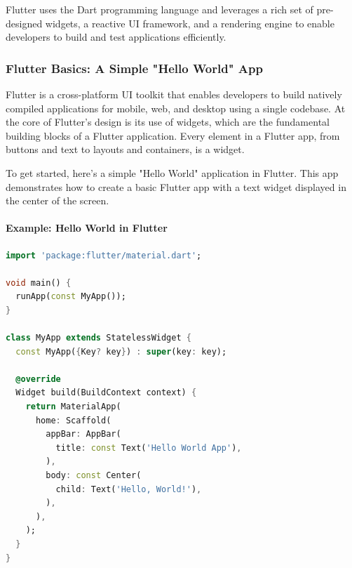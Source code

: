 \documentclass[12pt,a4paper]{report}
\begin{document}
Flutter uses the Dart programming language and leverages a rich set of pre-designed widgets, a reactive UI framework, and a rendering engine to enable developers to build and test applications efficiently.

\subsubsection{Flutter Basics: A Simple "Hello World" App}

Flutter is a cross-platform UI toolkit that enables developers to build natively compiled applications for mobile, web, and desktop using a single codebase. At the core of Flutter's design is its use of widgets, which are the fundamental building blocks of a Flutter application. Every element in a Flutter app, from buttons and text to layouts and containers, is a widget.

To get started, here’s a simple "Hello World" application in Flutter. This app demonstrates how to create a basic Flutter app with a text widget displayed in the center of the screen.

\paragraph{Example: Hello World in Flutter}

\begin{lstlisting}[language=Dart, caption={Flutter Hello World App}]
import 'package:flutter/material.dart';

void main() {
  runApp(const MyApp());
}

class MyApp extends StatelessWidget {
  const MyApp({Key? key}) : super(key: key);

  @override
  Widget build(BuildContext context) {
    return MaterialApp(
      home: Scaffold(
        appBar: AppBar(
          title: const Text('Hello World App'),
        ),
        body: const Center(
          child: Text('Hello, World!'),
        ),
      ),
    );
  }
}
\end{lstlisting}
\end{document}
